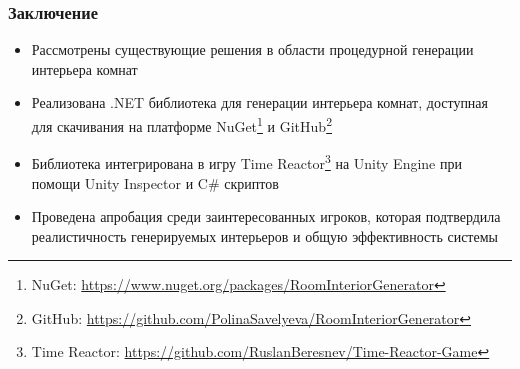 \documentclass{beamer}
\begin{document}
\begin{frame}
  \frametitle{Заключение}
    \begin{itemize}
        \item Рассмотрены существующие решения в области процедурной генерации интерьера комнат
        \item Реализована .NET библиотека для генерации интерьера комнат, доступная для скачивания на платформе NuGet\footnote{NuGet: \url{https://www.nuget.org/packages/RoomInteriorGenerator}} и GitHub\footnote{GitHub: \url{https://github.com/PolinaSavelyeva/RoomInteriorGenerator}}
        \item Библиотека интегрирована в игру Ti\-me Re\-ac\-tor\footnote{Time Reactor: \url{https://github.com/RuslanBeresnev/Time-Reactor-Game}} на Uni\-ty En\-gi\-ne при помощи Uni\-ty Ins\-pec\-tor и C\# скриптов
        \item Проведена апробация среди заинтересованных игроков, которая подтвердила реалистичность генерируемых интерьеров и общую эффективность системы 
    \end{itemize}
\end{frame}
\end{document}
